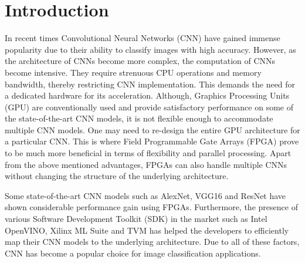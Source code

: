 \chapter{Introduction}
In recent times Convolutional Neural Networks (CNN) have gained immense popularity due to their ability to classify images with high accuracy. However, as the architecture of CNNs become more complex, the computation of CNNs become intensive. They require strenuous CPU operations and memory bandwidth, thereby restricting CNN implementation. This demands the need for a dedicated
hardware for its acceleration. Although, Graphics Processing Units (GPU) are conventionally used and provide satisfactory performance on some of the state-of-the-art CNN models, it is not flexible enough to accommodate multiple CNN models. One may need to re-design the entire GPU architecture for a particular CNN. This is where Field Programmable
Gate Arrays (FPGA) prove to be much more beneficial in terms of flexibility
and parallel processing. Apart from the above mentioned advantages, FPGAs can also handle multiple CNNs without changing the structure of the underlying architecture. 

Some state-of-the-art CNN models such as AlexNet,
VGG16 and ResNet have shown considerable performance gain using FPGAs.
Furthermore, the presence of various Software Development Toolkit (SDK)
in the market such as Intel OpenVINO, Xilinx ML Suite and TVM has helped
the developers to efficiently map their CNN models to the underlying architecture. Due to all of these factors, CNN has become a popular choice for image
classification applications.


